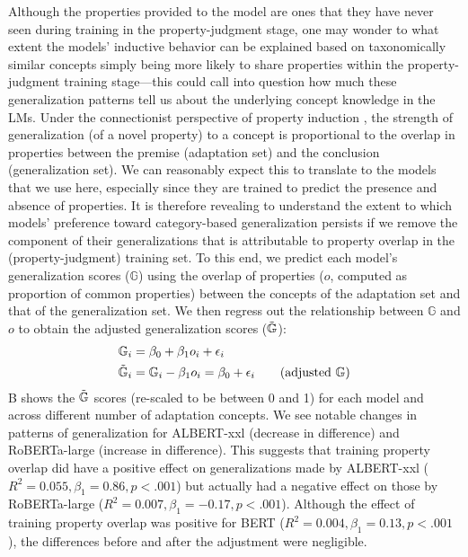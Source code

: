 \documentclass[10pt,letterpaper]{article}
\begin{document}
Although the properties provided to the model are ones that they have never seen during training in the property-judgment stage, one may wonder to what extent the models' inductive behavior can be explained based on taxonomically similar concepts simply being more likely to share properties within the property-judgment training stage---this could call into question how much these generalization patterns tell us about the underlying concept knowledge in the LMs.  
Under the connectionist perspective of property induction \citep{sloman1993feature, rogers2004semantic}, the strength of generalization (of a novel property) to a concept is proportional to the overlap in properties between the premise (adaptation set) and the conclusion (generalization set).
We can reasonably expect this to translate to the models that we use here,
especially since they are trained to predict the presence and absence of properties.
It is therefore revealing to understand the extent to which models' preference toward category-based generalization persists if we remove the component of their generalizations that is attributable to property overlap in the (property-judgment) training set.
To this end, we  predict each model's generalization scores ($\mathbb{G}$) using the overlap of properties ($o$, computed as proportion of common properties) between the concepts of the adaptation set and that of the generalization set. We then regress out the relationship between $\mathbb{G}$ and $o$ to obtain the adjusted generalization scores ($\Tilde{\mathbb{G}}$):
\begin{align*}
    \mathbb{G}_i &= \beta_0 + \beta_1 o_i + \epsilon_i\\
    \Tilde{\mathbb{G}}_i &= \mathbb{G}_i - \beta_1 o_i = \beta_0 + \epsilon_i \tag{adjusted $\mathbb{G}$}
\end{align*}
B shows the $\Tilde{\mathbb{G}}$ scores (re-scaled to be between 0 and 1) for each model and across different number of adaptation concepts.
We see notable changes in patterns of generalization for ALBERT-xxl (decrease in difference) and RoBERTa-large (increase in difference). 
This suggests that training property overlap did have a positive effect on generalizations made by ALBERT-xxl ($R^2=0.055, \beta_1 = 0.86, p < .001$) but actually had a negative effect on those by RoBERTa-large ($R^2=0.007, \beta_1 = -0.17, p < .001$). Although the effect of training property overlap was positive for BERT ($R^2=0.004, \beta_1 = 0.13, p < .001$), the differences before and after the adjustment were negligible.
\end{document}
